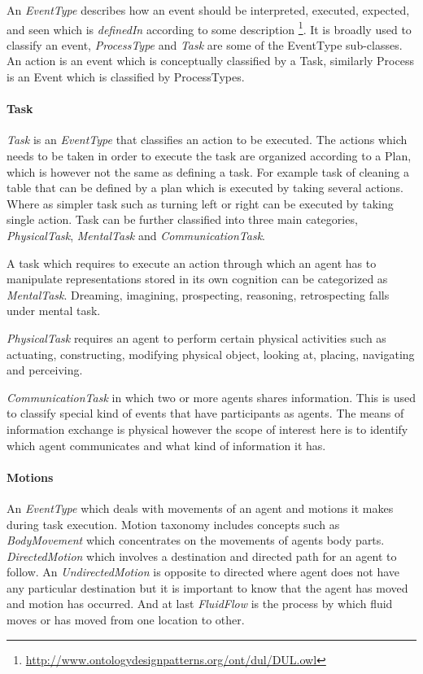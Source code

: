 An \emph{EventType} describes how an event should be interpreted, executed, expected, and seen which is \emph{definedIn} according to some description \footnote{\url{http://www.ontologydesignpatterns.org/ont/dul/DUL.owl}}. It is broadly used to classify an event, \emph{ProcessType} and \emph{Task} are some of the EventType sub-classes. An action is an event which is conceptually classified by a Task, similarly Process is an Event which is classified by ProcessTypes.  

\paragraph{Task}
\emph{Task} is an \emph{EventType} that classifies an action to be executed. The actions which needs to be taken in order to execute the task are organized according to a Plan, which is however not the same as defining a task. For example task of cleaning a table that can be defined by a plan which is executed by taking several actions. Where as simpler task such as turning left or right can be executed by taking single action. Task can be further classified into three main categories, \emph{PhysicalTask}, \emph{MentalTask} and \emph{CommunicationTask}. 

A task which requires to execute an action through which an agent has to manipulate representations stored in its own cognition can be categorized as \emph{MentalTask}. Dreaming, imagining, prospecting, reasoning, retrospecting falls under mental task. 

\emph{PhysicalTask} requires an agent to perform certain physical activities such as actuating, constructing, modifying physical object, looking at, placing, navigating and perceiving. 

\emph{CommunicationTask} in which two or more agents shares information. This is used to classify special kind of events that have participants as agents. The means of information exchange is physical however the scope of interest here is to  identify which agent communicates and what kind of information it has. 

\paragraph{Motions} 
An \emph{EventType} which deals with movements of an agent and motions it makes during task execution. Motion taxonomy includes concepts such as \emph{BodyMovement} which concentrates on the movements of agents body parts. \emph{DirectedMotion} which involves a destination and directed path for an agent to follow. An \emph{UndirectedMotion} is opposite to directed where agent does not have any particular destination but it is important to know that the agent has moved and motion has occurred. And at last \emph{FluidFlow} is the process by which fluid moves or has moved from one location to other.  

